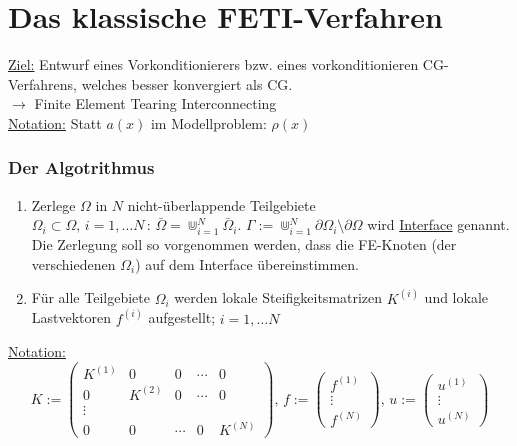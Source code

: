 \chapter {Das klassische FETI-Verfahren}

\underline{Ziel:} Entwurf eines Vorkonditionierers bzw. eines vorkonditionieren CG-Verfahrens, welches besser konvergiert als CG.\\
$\rightarrow$ Finite Element Tearing Interconnecting \\
\underline{Notation:} Statt $a(x)$ im Modellproblem: $\rho (x)$\\

\subsection{Der Algotrithmus}

\begin{enumerate}
\item 
Zerlege $\Omega$ in $N$ nicht-überlappende Teilgebiete $\Omega_i \subset \Omega,\, i=1,\dots N \, : \, \bar \Omega = \Cup_{i=1}^N \bar \Omega_i $. $ \Gamma := \Cup_{i=1}^N \partial \Omega_i \setminus \partial \Omega$ wird \underline{Interface} genannt.\\
Die Zerlegung soll so vorgenommen werden, dass die FE-Knoten (der verschiedenen $\Omega_i$) auf dem Interface übereinstimmen.
\item
Für alle Teilgebiete $\Omega_i$ werden lokale Steifigkeitsmatrizen $K^{(i)}$ und lokale Lastvektoren $f^{(i)}$ aufgestellt; $i=1,\dots N$\\
\end{enumerate} 

\underline{Notation:}
\[ K:= \begin{pmatrix}
    K^{(1)} & 0 & 0 & \cdots & 0 \\
    0 & K^{(2)}   & 0 & \cdots  &0 \\
    \vdots\\
    0 & 0 & \cdots & 0 & K^{(N)}
  \end{pmatrix}, \,
  f:= 
  \begin{pmatrix} 
    f^{(1)} \\
    \vdots \\
    f^{(N)}
  \end{pmatrix}, \, u:=  
  \begin{pmatrix}
    u^{(1)} \\
    \vdots \\
    u^{(N)}
  \end{pmatrix}
\]

